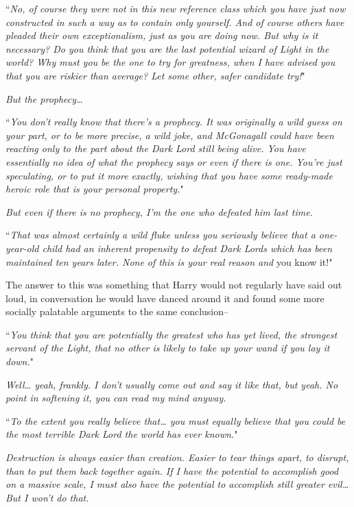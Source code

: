``\emph{No, of course they were not in this new reference class which you have just now constructed in such a way as to contain only yourself. And of course others have pleaded their own exceptionalism, just as you are doing now. But why is it necessary? Do you think that you are the last potential wizard of Light in the world? Why must \emph{you} be the one to try for greatness, when I have advised you that you are riskier than average? Let some other, safer candidate try!}"

\emph{But the prophecy{\ldots}}

``\emph{You don't really know that there's a prophecy. It was originally a wild guess on your part, or to be more precise, a wild joke, and McGonagall could have been reacting \emph{only} to the part about the Dark Lord still being alive. You have essentially no idea of what the prophecy says or even if there \emph{is} one. You're just speculating, or to put it more exactly, \emph{wishing} that you have some ready-made heroic role that is your personal property.}"

\emph{But even if there is no prophecy, I'm the one who defeated him last time.}

``\emph{That was almost certainly a wild fluke unless you seriously believe that a one-year-old child had an inherent propensity to defeat Dark Lords which has been maintained ten years later. None of this is your real reason and} you know it!"

The answer to this was something that Harry would not regularly have said out loud, in conversation he would have danced around it and found some more socially palatable arguments to the same conclusion\---

``\emph{You think that you are potentially the greatest who has yet lived, the strongest servant of the Light, that no other is likely to take up your wand if you lay it down.}"

\emph{Well{\ldots} yeah, frankly. I don't usually come out and say it like that, but yeah. No point in softening it, you can read my mind anyway.}

``\emph{To the extent you really believe that{\ldots} you must equally believe that you could be the most terrible Dark Lord the world has ever known.}"

\emph{Destruction is always easier than creation. Easier to tear things apart, to disrupt, than to put them back together again. If I have the potential to accomplish good on a massive scale, I must also have the potential to accomplish still greater evil{\ldots} But I won't do that.}

